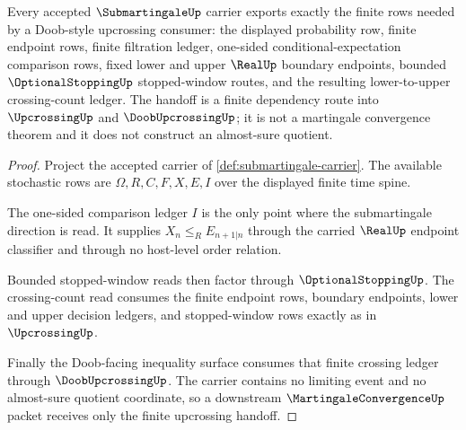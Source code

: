 \begin{theorem}
\label{thm:submartingale-doob-upcrossing-handoff}
Every accepted $\SubmartingaleUp$ carrier exports exactly the finite rows needed by a Doob-style upcrossing consumer: the displayed probability row, finite endpoint rows, finite filtration ledger, one-sided conditional-expectation comparison rows, fixed lower and upper $\RealUp$ boundary endpoints, bounded $\OptionalStoppingUp$ stopped-window routes, and the resulting lower-to-upper crossing-count ledger. The handoff is a finite dependency route into $\UpcrossingUp$ and $\DoobUpcrossingUp$; it is not a martingale convergence theorem and it does not construct an almost-sure quotient.
\end{theorem}
\begin{proof}
Project the accepted carrier of \autoref{def:submartingale-carrier}. The available stochastic rows are $\Omega,R,C,F,X,E,I$ over the displayed finite time spine.

The one-sided comparison ledger $I$ is the only point where the submartingale direction is read. It supplies $X_n\leq_R E_{n+1|n}$ through the carried $\RealUp$ endpoint classifier and through no host-level order relation.

Bounded stopped-window reads then factor through $\OptionalStoppingUp$. The crossing-count read consumes the finite endpoint rows, boundary endpoints, lower and upper decision ledgers, and stopped-window rows exactly as in $\UpcrossingUp$.

Finally the Doob-facing inequality surface consumes that finite crossing ledger through $\DoobUpcrossingUp$. The carrier contains no limiting event and no almost-sure quotient coordinate, so a downstream $\MartingaleConvergenceUp$ packet receives only the finite upcrossing handoff.
\end{proof}

